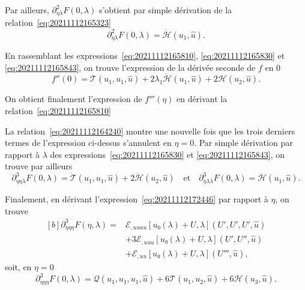 \documentclass[12pt, final]{amsart}
\begin{document}
Par ailleurs, \(\partial_{η\lambda}^2F(0, \lambda)\) s'obtient par simple
dérivation de la relation~\eqref{eq:20211112165323}
\begin{equation}
  \label{eq:20211112165843}
  \partial_{η\lambda}^2F(0, \lambda)=\dot{\mathcal H}(u_1, \hat{u}).
\end{equation}

En rassemblant les expressions~\eqref{eq:20211112165810},
\eqref{eq:20211112165830} et \eqref{eq:20211112165843}, on trouve l'expression
de la dérivée seconde de \(f\) en 0
\begin{equation}
  \label{eq:20211112182333}
  f''(0)=\mathcal T(u_1, u_1, \hat{u})
  +2\lambda_1\dot{\mathcal H}(u_1, \hat{u})
  +2\mathcal H(u_2, \hat{u}).
\end{equation}

On obtient finalement l'expression de \(f'''(η)\) en dérivant la
relation~\eqref{eq:20211112165810}

La relation~\eqref{eq:20211112164240} montre une nouvelle fois que les trois
derniers termes de l'expression ci-dessus s'annulent en \(η=0\). Par simple
dérivation par rapport à \(\lambda\) des expressions~\eqref{eq:20211112165830}
et \eqref{eq:20211112165843}, on trouve par ailleurs
\begin{equation}
  \label{eq:20211112173247}
  \partial_{ηη\lambda}^3F(0, \lambda)
  =\dot{\mathcal T}(u_1, u_1, \hat{u})+2\dot{\mathcal H}(u_2, \hat{u})
  \quad\text{et}\quad
  \partial_{η\lambda\lambda}^3F(0, \lambda)
  =\ddot{\mathcal H}(u_1, \hat{u}).
\end{equation}

Finalement, en dérivant l'expression~\eqref{eq:20211112172446} par rapport à
\(η\), on trouve
\begin{equation}
  \begin{aligned}[b]
    \partial_{ηηη}^3F(η, \lambda)={}&
    ℰ_{,uuuu}[u₀(\lambda)+U, \lambda](U', U', U', \hat{u})\\
    &+3ℰ_{,uuu}[u₀(\lambda)+U, \lambda](U', U'', \hat{u})\\
    &+ℰ_{,uu}[u₀(\lambda)+U, \lambda](U''', \hat{u}),
  \end{aligned}
\end{equation}
soit, en \(η=0\)
\begin{equation}
  \label{eq:20211112173300}
  \partial_{ηηη}^3F(0, \lambda)=
  \mathcal Q(u_1, u_1, u_1, \hat{u})
  +6\mathcal T(u_1, u_2, \hat{u})
  +6\mathcal H(u_3, \hat{u}).
\end{equation}
\end{document}

